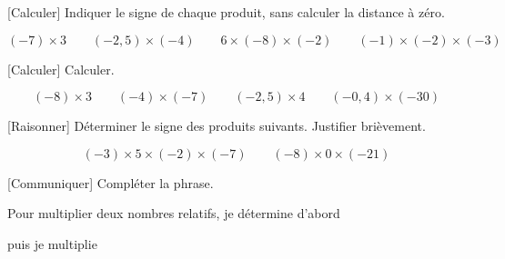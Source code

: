 \documentclass[12pt,a4paper]{article}
\begin{document}

[Calculer]
Indiquer le signe de chaque produit, sans calculer la distance à zéro. 

\[
(-7)\times3
\qquad
(-2{,}5)\times(-4)
\qquad
6\times(-8)\times(-2)
\qquad
(-1)\times(-2)\times(-3)
\]


[Calculer]
Calculer. 

\[
(-8)\times3
\qquad
(-4)\times(-7)
\qquad
(-2{,}5)\times4
\qquad
(-0{,}4)\times(-30)
\]


[Raisonner]
Déterminer le signe des produits suivants. Justifier brièvement. 

\[
(-3)\times5\times(-2)\times(-7)
\qquad
(-8)\times0\times(-21)
\]


[Communiquer]
Compléter la phrase. 

Pour multiplier deux nombres relatifs, je détermine d'abord \dotfill

puis je multiplie \dotfill

\end{document}
